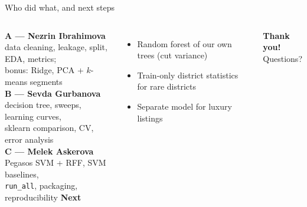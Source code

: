 \documentclass[aspectratio=169,11pt]{beamer}
\newcommand{\hl}[1]{{\Large\bfseries\color{accent}#1}}
\begin{document}
\begin{frame}{Who did what, and next steps}
  \begin{columns}[T]
    \textbf{A --- Nezrin Ibrahimova}\\
    {\small data cleaning, leakage, split, EDA, metrics;\\ bonus: Ridge, PCA + $k$-means segments}\\[0.5em]
    \textbf{B --- Sevda Gurbanova}\\
    {\small decision tree, sweeps, learning curves,\\ sklearn comparison, CV, error analysis}\\[0.5em]
    \textbf{C --- Melek Askerova}\\
    {\small Pegasos SVM + RFF, SVM baselines,\\ \texttt{run\_all}, packaging, reproducibility}
    \textbf{Next}
    \begin{itemize}
      \item Random forest of our own trees (cut variance)
      \item Train-only district statistics for rare districts
      \item Separate model for luxury listings
    \end{itemize}
    \vspace{1em}
    \hl{Thank you!}\\
    {\color{muted}Questions?}
  \end{columns}
\end{frame}
\end{document}
